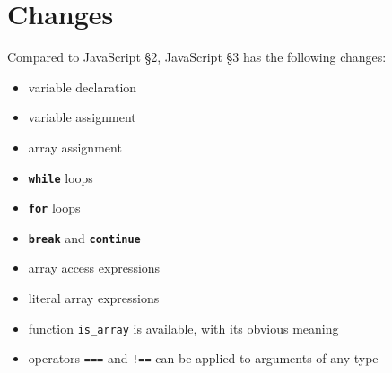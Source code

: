 





\section{Changes}

Compared to JavaScript \S 2, JavaScript \S 3 has the following changes:
\begin{itemize}
\item variable declaration
\item variable assignment
\item array assignment
\item \textbf{\texttt{while}} loops
\item \textbf{\texttt{for}} loops
\item \textbf{\texttt{break}} and \textbf{\texttt{continue}}
\item array access expressions
\item literal array expressions
\item function
\lstinline{is_array} is available, with its obvious meaning
\item operators \texttt{===} and \texttt{!==} can be applied to
arguments of any type
\end{itemize}



\newpage



\newpage





































\newpage



\newpage



    
